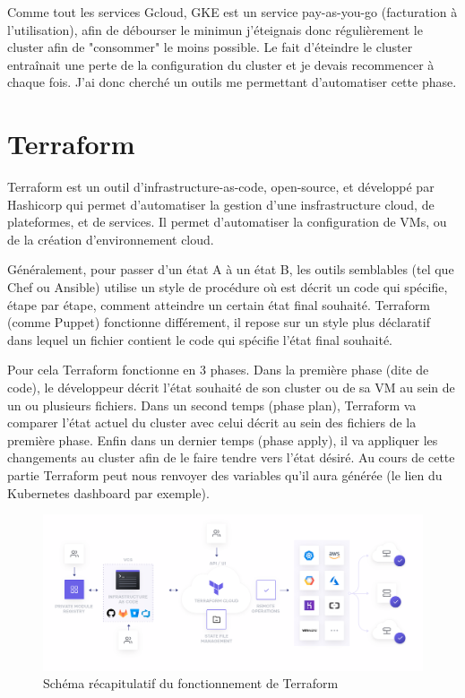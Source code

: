 \documentclass[11pt,fleqn]{book} %
\begin{document}
Comme tout les services Gcloud, GKE est un service pay-as-you-go (facturation à l’utilisation), afin de débourser le minimun j'éteignais donc régulièrement le cluster afin de "consommer" le moins possible. Le fait d'éteindre le cluster entraînait une perte de la configuration du cluster et je devais recommencer à chaque fois. J'ai donc cherché un outils me permettant d'automatiser cette phase.

\section*{Terraform}
Terraform est un outil d'infrastructure-as-code, open-source, et développé par Hashicorp qui permet d'automatiser la gestion d'une insfrastructure cloud, de plateformes, et de services. Il permet d'automatiser la configuration de VMs, ou de la création d'environnement cloud. \newline

Généralement, pour passer d'un état A à un état B, les outils semblables (tel que Chef ou Ansible) utilise un style de procédure où est décrit un code qui spécifie, étape par étape, comment atteindre un certain état final souhaité. Terraform (comme Puppet)  fonctionne différement, il repose sur un style plus déclaratif dans lequel un fichier contient le code qui spécifie l'état final souhaité. \newline

Pour cela Terraform fonctionne en 3 phases. Dans la première phase (dite de code), le développeur décrit l'état souhaité de son cluster ou de sa VM au sein de un ou plusieurs fichiers. Dans un second temps (phase plan), Terraform va comparer l'état actuel du cluster avec celui décrit au sein des fichiers de la première phase. Enfin dans un dernier temps (phase apply), il va appliquer les changements au cluster afin de le faire tendre vers l'état désiré. Au cours de cette partie Terraform peut nous renvoyer des variables qu'il aura générée (le lien du Kubernetes dashboard par exemple).\newline

\begin{figure}[H]\centering
\renewcommand{\figurename}{Schéma}
\includegraphics[scale=0.22]{Pictures/annexe/terraform-cloud.png}
\captionsetup{margin=1.5cm,format=hang,justification=justified}
\caption[]{Schéma récapitulatif du fonctionnement de Terraform \newline}
\end{figure}
\end{document}

